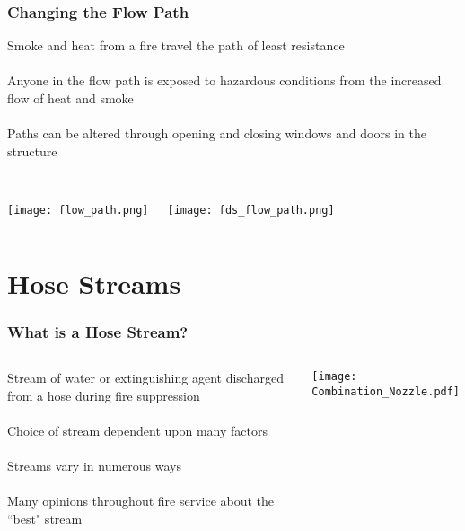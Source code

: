 \documentclass[t]{beamer}
\begin{document}

\begin{frame}
\frametitle{Changing the Flow Path}
Smoke and heat from a fire travel the path of least resistance 
\\~\\
Anyone in the flow path is exposed to hazardous conditions from the increased flow of heat and smoke
\\~\\
Paths can be altered through opening and closing windows and doors in the structure
\\~\\
\begin{columns}
\column{.5\framewidth}
\centerline{\texttt{[image: flow\_path.png]}}
\column{.5\framewidth}
\centerline{\texttt{[image: fds\_flow\_path.png]}}
\end{columns}
\end{frame}

\section{Hose Streams}

\begin{frame}
\frametitle{What is a Hose Stream?}
\begin{columns}
	\column{.65\framewidth}
Stream of water or extinguishing agent discharged from a hose during fire suppression
\\~\\
Choice of stream dependent upon many factors
\\~\\
Streams vary in numerous ways
\\~\\
Many opinions throughout fire service about the ``best" stream
	\column{.3\framewidth}
	\\~\\
	\centerline{\texttt{[image: Combination\_Nozzle.pdf]}}
\end{columns}
\end{frame}
\end{document}
